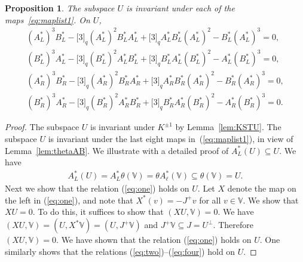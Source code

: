 \documentclass[pdftex]{sigma}
\numberwithin{equation}{section}
\newtheorem{Proposition}[Theorem]{Proposition}
 { \theoremstyle{definition}
\newtheorem{Definition}[Theorem]{Definition}
\newtheorem{Example}[Theorem]{Example}
\newtheorem{Note}[Theorem]{Note}
}
\begin{document}
\begin{Proposition}\label{prop:Uinv}The subspace $U$ is invariant under each of the maps~\eqref{eq:maplist1}. On $U$,
\begin{gather}\label{eq:one}
(A^*_L)^3 B^*_L
-\lbrack 3 \rbrack_q (A^*_L)^2 B^*_L A^*_L
+\lbrack 3 \rbrack_q A^*_L B^*_L (A^*_L)^2
-B^*_L (A^*_L)^3 = 0,
\\
\label{eq:two}
(B^*_L)^3 A^*_L -\lbrack 3 \rbrack_q (B^*_L)^2 A^*_L B^*_L
+\lbrack 3 \rbrack_q B^*_L A^*_L (B^*_L)^2
-A^*_L (B^*_L)^3 = 0,
\\
\label{eq:three}(A^*_R)^3 B^*_R
-\lbrack 3 \rbrack_q (A^*_R)^2 B^*_R A^*_R
+\lbrack 3 \rbrack_q A^*_R B^*_R (A^*_R)^2
-B^*_R (A^*_R)^3 = 0,\\
\label{eq:four}
(B^*_R)^3 A^*_R
-\lbrack 3 \rbrack_q (B^*_R)^2 A^*_R B^*_R
+\lbrack 3 \rbrack_q B^*_R A^*_R (B^*_R)^2
-A^*_R (B^*_R)^3 = 0.
\end{gather}
\end{Proposition}
\begin{proof}The subspace $U$ is invariant under $K^{\pm 1}$ by Lemma~\ref{lem:KSTU}. The subspace $U$ is invariant under the last eight maps in~(\ref{eq:maplist1}), in view of Lemma~\ref{lem:thetaAB}.
We illustrate with a detailed proof of $A^*_L (U) \subseteq U$. We have
\begin{gather*}
A^*_L (U) = A^*_L \theta (\mathbb V) = \theta A^*_\ell (\mathbb V)
\subseteq \theta (\mathbb V) = U.
\end{gather*}
Next we show that the relation (\ref{eq:one}) holds on $U$.
Let $X$ denote the map on the left in (\ref{eq:one}), and note
that $X^*(v)=-J^+v$ for all $v \in \mathbb V$. We show that
$XU=0$. To do this, it suffices to show that $(XU,\mathbb V)=0$. We have
$(XU,\mathbb V) = (U,X^*\mathbb V)=(U, J^+\mathbb V)$
and $J^+\mathbb V \subseteq J = U^\perp$. Therefore
$(XU,\mathbb V)=0$.
We have shown that the relation (\ref{eq:one}) holds on $U$.
One similarly shows that the relations (\ref{eq:two})--(\ref{eq:four}) hold on $U$.
\end{proof}
\end{document}
